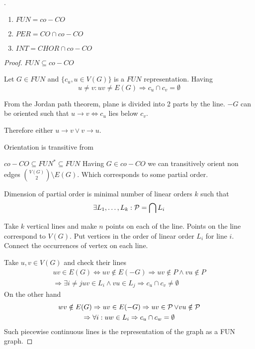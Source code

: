 \begin{theorem}[Complements]
	.
	\begin{enumerate}
		\item $FUN = co-CO$
		\item $PER = CO \cap co-CO$
		\item $INT = CHOR \cap co-CO$
	\end{enumerate}
\end{theorem}
\begin{proof}
	$FUN \subseteq co-CO$

	Let $G \in FUN$ and $\{ c_u, u \in V(G) \}$ is a $FUN$ representation.
	Having
	\[ u \ne v: uv \ne E(G) \Rightarrow c_u \cap c_v = \emptyset \]

	From the Jordan path theorem, plane is divided into 2 parts by the line.
	$-G$ can be oriented such that $u \rightarrow v \iff c_u$ lies below $c_v$.

	Therefore either $u \rightarrow v \lor v \rightarrow u$.

	Orientation is transitive from %

	$co-CO \subseteq FUN^{\ast} \subseteq FUN$
	Having $G \in co-CO$ we can transitively orient non edges $\binom{V(G)}{2} \setminus E(G)$.
	Which corresponds to some partial order.

	\begin{definition}[PO dimension]
		Dimension of partial order is minimal number of linear orders $k$ such that
		\[ \exists L_1, \ldots, L_k: \operatorname{\mathcal{P}} = \bigcap L_i \]
	\end{definition}

	Take $k$ vertical lines and make $n$ points on each of the line.
	Points on the line correspond to $V(G)$.
	Put vertices in the order of linear order $L_i$ for line $i$.
	Connect the occurrences of vertex on each line.

	Take $u, v \in V(G)$ and check their lines
	\begin{gather*}
		uv \in E(G) \iff uv \notin E(-G) \Rightarrow uv \notin P \land vu \notin P \\
	\Rightarrow \exists i \ne j uv \in L_i \land vu \in L_j \Rightarrow c_u \cap c_v \ne \emptyset
	\end{gather*}
	On the other hand
	\begin{gather*}
		wv \notin E(G) \Rightarrow uv \in E(-G) \Rightarrow uv \in \operatorname{\mathcal{P}} \lor vu \notin \operatorname{\mathcal{P}} \\
		\Rightarrow \forall i: uw \in L_i \Rightarrow c_u \cap c_w = \emptyset
	\end{gather*}
	Such piecewise continuous lines is the representation of the graph as a FUN graph.


\end{proof}
